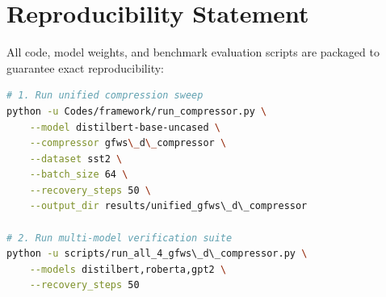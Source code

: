 \section{Reproducibility Statement}
All code, model weights, and benchmark evaluation scripts are packaged to guarantee exact reproducibility:
\begin{lstlisting}[language=bash]
# 1. Run unified compression sweep
python -u Codes/framework/run_compressor.py \
    --model distilbert-base-uncased \
    --compressor gfws\_d\_compressor \
    --dataset sst2 \
    --batch_size 64 \
    --recovery_steps 50 \
    --output_dir results/unified_gfws\_d\_compressor

# 2. Run multi-model verification suite
python -u scripts/run_all_4_gfws\_d\_compressor.py \
    --models distilbert,roberta,gpt2 \
    --recovery_steps 50
\end{lstlisting}
